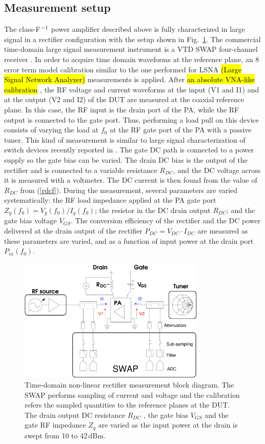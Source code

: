 \documentclass[journal]{IEEEtran}
\begin{document}
\subsection {Measurement setup}
% 
The class-F$^{\rm -1}$ power amplifier described above is fully characterized in large signal in a rectifier configuration with the setup shown in Fig.~\ref{measurement_setup}. The commercial time-domain large signal measurement instrument is a VTD SWAP four-channel receiver \cite{SWAP}. In order to acquire time domain waveforms at the reference plane, an 8 error term model calibration similar to the one performed for LSNA \hl{(Large Signal Network Analyzer)} measurements is applied. After \hl{an absolute VNA-like calibration} \cite{verspecht}, the RF voltage and current waveforms at the input (V1 and I1) and at the output (V2 and I2) of the DUT are measured at the coaxial reference plane. In this case, the RF input is the drain port of the PA, while the RF output is connected to the gate port. Thus, performing a load pull on this device consists of varying the load at $f_0$ at the RF gate port of the PA with a passive tuner. This kind of measurement is similar to large signal characterization of switch devices recently reported in \cite{switch,faraj_arftg_2012}. The gate DC path is connected to a power supply so the gate bias can be varied. The drain DC bias is the output of the rectifier and is connected to a variable resistance $R_{DC}$, and the DC voltage across it is measured with a voltmeter. The DC current is then found from the value of $R_{DC}$ from (\ref{rdcf}). During the measurement, several parameters are varied systematically: the RF load impedance applied at the PA gate port $Z_g(f_0)=V_g(f_0)/I_g(f_0)$; the resistor in the DC drain output $R_{DC}$; and the gate bias voltage $V_{GS}$. The conversion efficiency of the rectifier and the DC power delivered at the drain output of the rectifier $P_{DC}= V_{DC} \cdot I_{DC}$ are measured as these parameters are varied, and as a function of input power at the drain port $P_{in}(f_0)$.





\begin{figure}[ht!]
\centering
\includegraphics[width=3.5in]{pdf/10.pdf}
\caption{Time-domain non-linear rectifier measurement block diagram. The SWAP \cite{SWAP} performs sampling of current and voltage and the calibration refers the sampled quantities to the reference planes at the DUT. The drain output DC resistance $R_{DC}$ , the gate bias $V_{GS}$ and the gate RF impedance $Z_g$ are varied as the input power at the drain is swept from 10 to 42\,dBm.}
\label{measurement_setup}
\end{figure}
\end{document}
